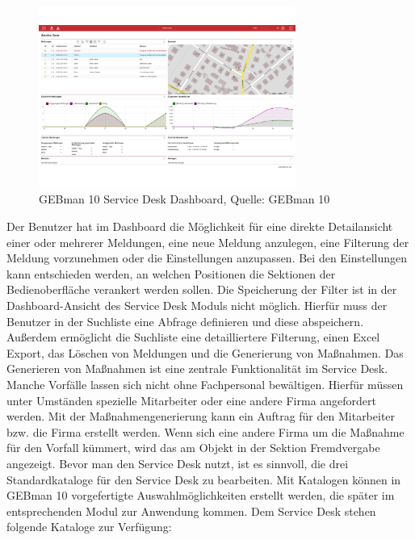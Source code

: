 \begin{figure}[h!]
\centering
	\includegraphics[width=0.75\textwidth]{Abbildungen/GEBman.pdf}
	\caption[GEBman 10 Service Desk Dashboard]{GEBman 10 Service Desk Dashboard, Quelle: 
	GEBman 10}
	\label{fig:GEBman10 Service Desk Dashboard}
\end{figure}

\noindent
Der Benutzer hat im Dashboard die Möglichkeit für eine direkte Detailansicht einer oder mehrerer Meldungen, eine neue Meldung anzulegen, eine Filterung der Meldung vorzunehmen oder die Einstellungen anzupassen. Bei den Einstellungen kann entschieden werden, an welchen Positionen die Sektionen der Bedienoberfläche verankert werden sollen.\newline
Die Speicherung der Filter ist in der Dashboard-Ansicht des Service Desk Moduls nicht möglich. Hierfür muss der Benutzer in der Suchliste eine Abfrage definieren und diese abspeichern. Außerdem ermöglicht die Suchliste eine detailliertere Filterung, einen Excel Export, das Löschen von Meldungen und die Generierung von Maßnahmen. Das Generieren von Maßnahmen ist eine zentrale Funktionalität im Service Desk. Manche Vorfälle lassen sich nicht ohne Fachpersonal bewältigen. Hierfür müssen unter Umständen spezielle Mitarbeiter oder eine andere Firma angefordert werden. Mit der Maßnahmengenerierung kann ein Auftrag für den Mitarbeiter bzw. die Firma erstellt werden. Wenn sich eine andere Firma um die Maßnahme für den Vorfall kümmert, wird das am Objekt in der Sektion Fremdvergabe angezeigt. \newline
Bevor man den Service Desk nutzt, ist es sinnvoll, die drei Standardkataloge für den Service Desk zu bearbeiten. Mit Katalogen können in GEBman 10  vorgefertigte Auswahlmöglichkeiten erstellt werden, die später im entsprechenden Modul zur Anwendung kommen. Dem Service Desk stehen folgende Kataloge zur Verfügung:\\

